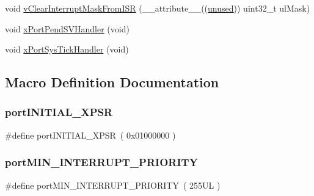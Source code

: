 \begin{DoxyCompactItemize}
void \mbox{\hyperlink{thirdparty_2freertos_2freertos-10_80_80_2_source_2portable_2_g_c_c_2_a_r_m___c_m0_2port_8c_ad292bbba4a300536d7475e0ec48bb1ba}{v\+Clear\+Interrupt\+Mask\+From\+I\+SR}} (\+\_\+\+\_\+attribute\+\_\+\+\_\+((\mbox{\hyperlink{group__group__sam0__utils_ga417dba7f63dde98dbebd6336d8af9d91}{unused}})) uint32\+\_\+t ul\+Mask)
\item 
void \mbox{\hyperlink{thirdparty_2freertos_2freertos-10_80_80_2_source_2portable_2_g_c_c_2_a_r_m___c_m0_2port_8c_a4e6b17b7b6e1a92564afdeff7e9dba91}{x\+Port\+Pend\+S\+V\+Handler}} (void)
\item 
void \mbox{\hyperlink{thirdparty_2freertos_2freertos-10_80_80_2_source_2portable_2_g_c_c_2_a_r_m___c_m0_2port_8c_a78100b2d36913d0b45565be8975e5de8}{x\+Port\+Sys\+Tick\+Handler}} (void)
\end{DoxyCompactItemize}


\subsection{Macro Definition Documentation}
\mbox{\label{thirdparty_2freertos_2freertos-10_80_80_2_source_2portable_2_g_c_c_2_a_r_m___c_m0_2port_8c_a062d03aca8ae932b4552a2aa19853b44}} 
\subsubsection{\texorpdfstring{portINITIAL\_XPSR}{portINITIAL\_XPSR}}
{\footnotesize\ttfamily \#define port\+I\+N\+I\+T\+I\+A\+L\+\_\+\+X\+P\+SR~( 0x01000000 )}

\mbox{\label{thirdparty_2freertos_2freertos-10_80_80_2_source_2portable_2_g_c_c_2_a_r_m___c_m0_2port_8c_a7695fa51586f81228c89bcf517ec44f3}} 
\subsubsection{\texorpdfstring{portMIN\_INTERRUPT\_PRIORITY}{portMIN\_INTERRUPT\_PRIORITY}}
{\footnotesize\ttfamily \#define port\+M\+I\+N\+\_\+\+I\+N\+T\+E\+R\+R\+U\+P\+T\+\_\+\+P\+R\+I\+O\+R\+I\+TY~( 255\+U\+L )}

